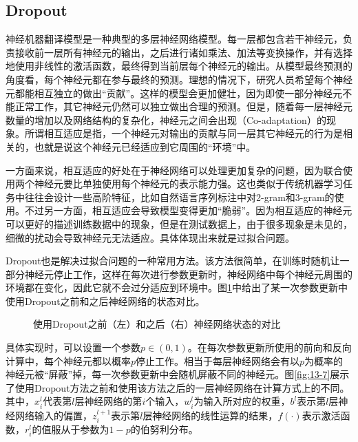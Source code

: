 
\subsection{Dropout}

\parinterval 神经机器翻译模型是一种典型的多层神经网络模型。每一层都包含若干神经元，负责接收前一层所有神经元的输出，之后进行诸如乘法、加法等变换操作，并有选择地使用非线性的激活函数，最终得到当前层每个神经元的输出。从模型最终预测的角度看，每个神经元都在参与最终的预测。理想的情况下，研究人员希望每个神经元都能相互独立的做出“贡献”。这样的模型会更加健壮，因为即使一部分神经元不能正常工作，其它神经元仍然可以独立做出合理的预测。但是，随着每一层神经元数量的增加以及网络结构的复杂化，神经元之间会出现{\small{}}（Co-adaptation）的现象。所谓相互适应是指，一个神经元对输出的贡献与同一层其它神经元的行为是相关的，也就是说这个神经元已经适应到它周围的“环境”中。

\parinterval 一方面来说，相互适应的好处在于神经网络可以处理更加复杂的问题，因为联合使用两个神经元要比单独使用每个神经元的表示能力强。这也类似于传统机器学习任务中往往会设计一些高阶特征，比如自然语言序列标注中对2-gram和3-gram的使用。不过另一方面，相互适应会导致模型变得更加“脆弱”。因为相互适应的神经元可以更好的描述训练数据中的现象，但是在测试数据上，由于很多现象是未见的，细微的扰动会导致神经元无法适应。具体体现出来就是过拟合问题。

\parinterval Dropout也是解决过拟合问题的一种常用方法。该方法很简单，在训练时随机让一部分神经元停止工作，这样在每次进行参数更新时，神经网络中每个神经元周围的环境都在变化，因此它就不会过分适应到环境中。图\ref{fig:13-6}中给出了某一次参数更新中使用Dropout之前和之后神经网络的状态对比。

\begin{figure}[htp]
\centering

\caption{使用Dropout之前（左）和之后（右）神经网络状态的对比}
\label{fig:13-6}
\end{figure}

\parinterval 具体实现时，可以设置一个参数$p \in (0,1)$。在每次参数更新所使用的前向和反向计算中，每个神经元都以概率$p$停止工作。相当于每层神经网络会有以$p$为概率的神经元被“屏蔽”掉，每一次参数更新中会随机屏蔽不同的神经元。图\ref{fig:13-7}展示了使用Dropout方法之前和使用该方法之后的一层神经网络在计算方式上的不同。其中，$x_{i}^{l}$代表第$l$层神经网络的第$i$个输入，$w_{i}^{l}$为输入所对应的权重，$b^{l}$表示第$l$层神经网络输入的偏置，$z_{i}^{l+1}$表示第$l$层神经网络的线性运算的结果，$f(\cdot)$表示激活函数，$r_{i}^{l}$的值服从于参数为$1-p$的伯努利分布。

